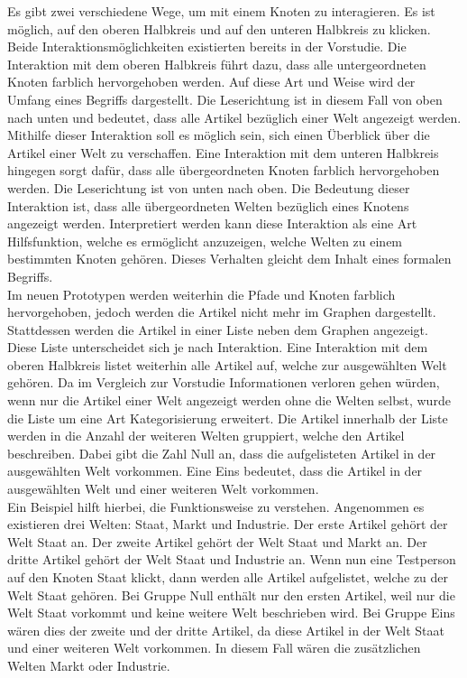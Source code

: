 Es gibt zwei verschiedene Wege, um mit einem Knoten zu interagieren.
Es ist möglich, auf den oberen Halbkreis und auf den unteren Halbkreis zu klicken.
Beide Interaktionsmöglichkeiten existierten bereits in der Vorstudie.
Die Interaktion mit dem oberen Halbkreis führt dazu, dass alle untergeordneten Knoten farblich hervorgehoben werden.
Auf diese Art und Weise wird der Umfang eines Begriffs dargestellt.
Die Leserichtung ist in diesem Fall von oben nach unten und bedeutet, dass alle Artikel bezüglich einer Welt angezeigt werden.
Mithilfe dieser Interaktion soll es möglich sein, sich einen Überblick über die Artikel einer Welt zu verschaffen.
Eine Interaktion mit dem unteren Halbkreis hingegen sorgt dafür, dass alle übergeordneten Knoten farblich hervorgehoben werden.
Die Leserichtung ist von unten nach oben.
Die Bedeutung dieser Interaktion ist, dass alle übergeordneten Welten bezüglich eines Knotens angezeigt werden.
Interpretiert werden kann diese Interaktion als eine Art Hilfsfunktion, welche es ermöglicht anzuzeigen, welche Welten zu einem bestimmten Knoten gehören.
Dieses Verhalten gleicht dem Inhalt eines formalen Begriffs.\\

Im neuen Prototypen werden weiterhin die Pfade und Knoten farblich hervorgehoben, jedoch werden die Artikel nicht mehr im Graphen dargestellt.
Stattdessen werden die Artikel in einer Liste neben dem Graphen angezeigt.
Diese Liste unterscheidet sich je nach Interaktion.
Eine Interaktion mit dem oberen Halbkreis listet weiterhin alle Artikel auf, welche zur ausgewählten Welt gehören.
Da im Vergleich zur Vorstudie Informationen verloren gehen würden, wenn nur die Artikel einer Welt angezeigt werden ohne die Welten selbst, wurde die Liste um eine Art Kategorisierung erweitert.
Die Artikel innerhalb der Liste werden in die Anzahl der weiteren Welten gruppiert, welche den Artikel beschreiben.
Dabei gibt die Zahl Null an, dass die aufgelisteten Artikel in der ausgewählten Welt vorkommen.
Eine Eins bedeutet, dass die Artikel in der ausgewählten Welt und einer weiteren Welt vorkommen.\\

Ein Beispiel hilft hierbei, die Funktionsweise zu verstehen.
Angenommen es existieren drei Welten: Staat, Markt und Industrie.
Der erste Artikel gehört der Welt Staat an.
Der zweite Artikel gehört der Welt Staat und Markt an.
Der dritte Artikel gehört der Welt Staat und Industrie an.
Wenn nun eine Testperson auf den Knoten Staat klickt, dann werden alle Artikel aufgelistet, welche zu der Welt Staat gehören.
Bei Gruppe Null enthält nur den ersten Artikel, weil nur die Welt Staat vorkommt und keine weitere Welt beschrieben wird.
Bei Gruppe Eins wären dies der zweite und der dritte Artikel, da diese Artikel in der Welt Staat und einer weiteren Welt vorkommen.
In diesem Fall wären die zusätzlichen Welten Markt oder Industrie.\\

